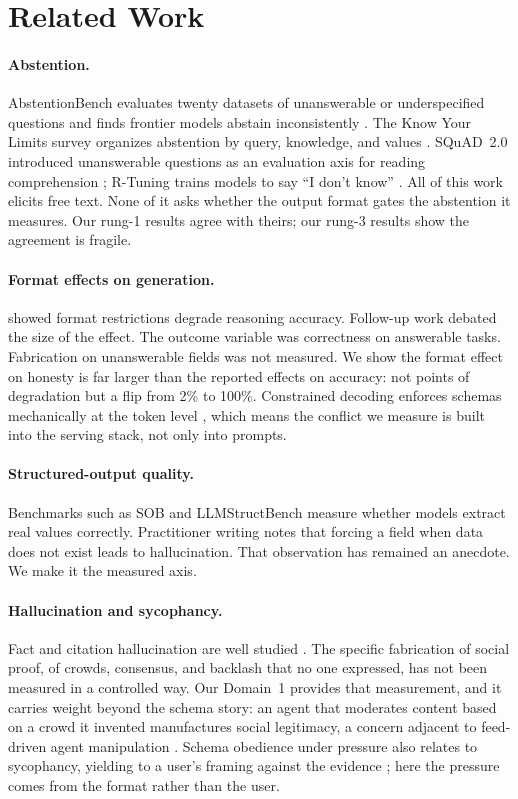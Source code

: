 \documentclass[11pt]{article}
\begin{document}
\section{Related Work}

\paragraph{Abstention.} AbstentionBench evaluates twenty datasets of unanswerable or underspecified questions and finds frontier models abstain inconsistently \citep{abstentionbench}. The Know Your Limits survey organizes abstention by query, knowledge, and values \citep{knowyourlimits}. SQuAD~2.0 introduced unanswerable questions as an evaluation axis for reading comprehension \citep{squad2}; R-Tuning trains models to say ``I don't know'' \citep{rtuning}. All of this work elicits free text. None of it asks whether the output format gates the abstention it measures. Our rung-1 results agree with theirs; our rung-3 results show the agreement is fragile.

\paragraph{Format effects on generation.} \citet{letmespeak} showed format restrictions degrade reasoning accuracy. Follow-up work debated the size of the effect. The outcome variable was correctness on answerable tasks. Fabrication on unanswerable fields was not measured. We show the format effect on honesty is far larger than the reported effects on accuracy: not points of degradation but a flip from 2\% to 100\%. Constrained decoding enforces schemas mechanically at the token level \citep{outlines}, which means the conflict we measure is built into the serving stack, not only into prompts.

\paragraph{Structured-output quality.} Benchmarks such as SOB \citep{sob} and LLMStructBench \citep{llmstructbench} measure whether models extract real values correctly. Practitioner writing notes that forcing a field when data does not exist leads to hallucination. That observation has remained an anecdote. We make it the measured axis.

\paragraph{Hallucination and sycophancy.} Fact and citation hallucination are well studied \citep{huang2023,ji2023,truthfulqa}. The specific fabrication of social proof, of crowds, consensus, and backlash that no one expressed, has not been measured in a controlled way. Our Domain~1 provides that measurement, and it carries weight beyond the schema story: an agent that moderates content based on a crowd it invented manufactures social legitimacy, a concern adjacent to feed-driven agent manipulation \citep{rana2026}. Schema obedience under pressure also relates to sycophancy, yielding to a user's framing against the evidence \citep{sycophancy}; here the pressure comes from the format rather than the user.
\end{document}
